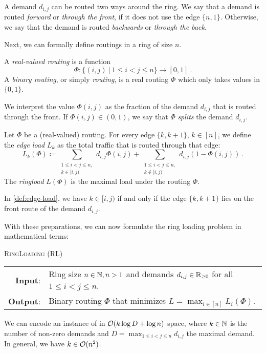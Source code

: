 A demand $d_{i, j}$ can be routed two ways around the ring.
We say that a demand is routed \emph{forward} or \emph{through the front}, if it does not use the edge $\{n, 1\}$.
Otherwise, we say that the demand is routed \emph{backwards} or \emph{through the back}.

Next, we can formally define routings in a ring of size $n$.
\begin{definition}[Routing]
	\label{def:routing}
	A \emph{real-valued routing} is a function 
	\begin{equation}
		\Phi: \{(i, j)\ | \ 1 \leq i < j \leq n\} \rightarrow [0, 1] \ .
	\end{equation}
	A \emph{binary routing}, or simply \emph{routing}, is a real routing $\Phi$ which only takes values in $\{0, 1\}$. 
\end{definition}
We interpret the value $\Phi(i, j)$ as the fraction of the demand $d_{i, j}$ that is routed through the front.
If $\Phi(i, j) \in (0, 1)$, we say that $\Phi$ \emph{splits} the demand $d_{i, j}$.

\begin{definition}
	\label{def:edge-load}
	Let $\Phi$ be a (real-valued) routing.
	For every edge $\{k, k+1\}$, $k \in [n]$, we define the \emph{edge load} $L_k$ as the total traffic that is routed through that edge:
	\begin{equation}
		\label{eq:edge-load}
		L_k(\Phi) \coloneqq \sum_{\substack{1 \leq i < j \leq n,\\ k \in [i, j)}} d_{i, j} \Phi(i, j) + \sum_{\substack{1 \leq i < j \leq n,\\ k \notin [i, j)}} d_{i, j} (1 - \Phi(i, j)) \ .
	\end{equation}
	The \emph{ringload} $L(\Phi)$ is the maximal load under the routing $\Phi$.
\end{definition}
In \cref{def:edge-load}, we have $k \in [i, j)$ if and only if the edge $\{k, k+1\}$ lies on the front route of the demand $d_{i, j}$.


With these preparations, we can now formulate the ring loading problem in mathematical terms:
\begin{center}
	\begin{mdframed}
		\centering
		\textsc{RingLoading} (\textsc{RL})\\[0.7em]
		\begin{tabular}{rl}
			{\bfseries Input}: & Ring size $n \in \mathbb{N}, n > 1$ and demands $d_{i, j} \in \mathbb{R}_{\geq 0}$ for all $1 \leq i<j\leq n$.\\
			{\bfseries Output}: & Binary routing $\Phi$ that minimizes $L = \max_{i \in [n]} L_i(\Phi)$.
		\end{tabular}
	\end{mdframed}
\end{center}
We can encode an instance of \RL in $\mathcal{O}(k \log D + \log n)$ space, where $k \in \mathbb{N}$ is the number of non-zero demands and $D = \max_{1 \leq i < j \leq n}d_{i, j}$ the maximal demand.
In general, we have $k \in \mathcal{O}(n^2)$.

